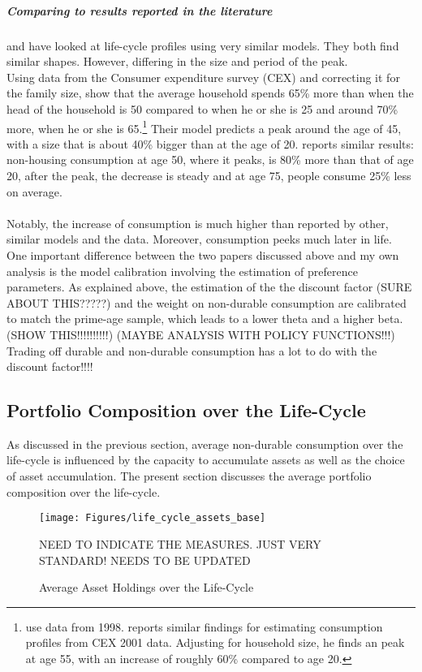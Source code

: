 \documentclass[a4paper,12pt]{article}
\begin{document}
\subparagraph{Comparing to results reported in the literature} \cite{FV&K2011} and \cite{yang2009} have looked at life-cycle profiles using very similar models. They both find similar shapes. However, differing in the size and period of the peak.\\
Using data from the Consumer expenditure survey (CEX) and correcting it for the family size, \cite{FV&K2011} show that the average household spends 65\% more than when the head of the household is 50 compared to when he or she is 25 and around 70\% more, when he or she is 65.\footnote{\cite{FV&K2011} use data from 1998. \cite{yang2009} reports similar findings for estimating consumption profiles from CEX 2001 data. Adjusting for household size, he finds an peak at age 55, with an increase of roughly 60\% compared to age 20.} Their model predicts a peak around the age of 45, with a size that is about 40\% bigger than at the age of 20.  \cite{yang2009} reports similar results: non-housing consumption at age 50, where it peaks, is 80\% more than that of age 20, after the peak, the decrease is steady and at age 75, people consume 25\% less on average. \\ \\
Notably, the increase of consumption is much higher than reported by other, similar models and the data. Moreover, consumption peeks much later in life. One important difference between the two papers discussed above and my own analysis is the model calibration involving the estimation of preference parameters. As explained above, the estimation of the the discount factor (SURE ABOUT THIS?????) and the weight on non-durable consumption are calibrated to match the prime-age sample, which leads to a lower theta and a higher beta. (SHOW THIS!!!!!!!!!!) 
(MAYBE ANALYSIS WITH POLICY FUNCTIONS!!!) 
Trading off durable and non-durable consumption has a lot to do with the discount factor!!!! 

\subsection{Portfolio Composition over the Life-Cycle}
As discussed in the previous section, average non-durable consumption over the life-cycle is influenced by the capacity to accumulate assets as well as the choice of asset accumulation. The present section discusses the average portfolio composition over the life-cycle. 

\begin{figure}[!htbp]
\caption{Average Asset Holdings over the Life-Cycle} 
\label{asset_holdings_life_cycle}	%
\centering
\texttt{[image: Figures/life\_cycle\_assets\_base]}  %

\begin{minipage}{0.8\linewidth}
\footnotesize{NEED TO INDICATE THE MEASURES. JUST VERY STANDARD! NEEDS TO BE UPDATED}
\end{minipage}

\end{figure}
\end{document}
